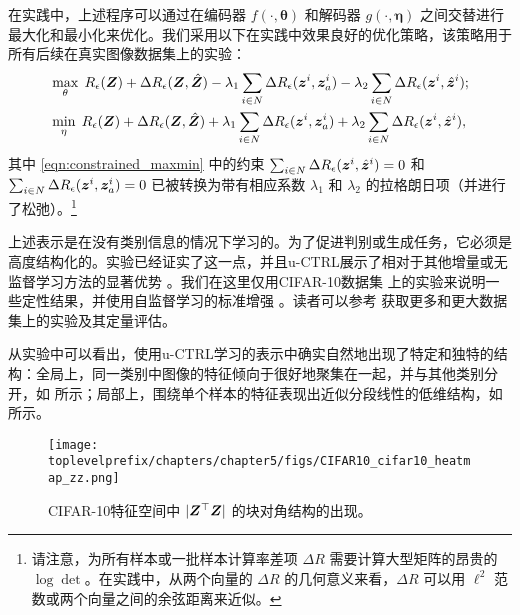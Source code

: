 \documentclass[../../book-main_zh.tex]{subfiles}
\begin{document}
在实践中，上述程序可以通过在编码器 $f(\cdot,\bm \theta)$ 和解码器 $g(\cdot,\bm \eta)$ 之间交替进行最大化和最小化来优化。我们采用以下在实践中效果良好的优化策略，该策略用于所有后续在真实图像数据集上的实验：
\vspace{-1mm}
\begin{align}
  &  \max_{\theta}\; R_\epsilon(\bm{Z}) + \Delta{R_\epsilon(\bm{Z}, \hat{\bm{Z}})-\lambda_{1}\sum_{i\in N} \Delta R_\epsilon(\bm{z}^i, \bm{z}_{a}^i)} -\lambda_{2}\sum_{i\in N} \Delta R_\epsilon(\bm{z}^i, \hat{\bm{z}}^i) \label{eqn:constrained_max}; \\
   & \min_{\eta}\; R_\epsilon(\bm{Z}) + \Delta{R_\epsilon(\bm{Z}, \hat{\bm{Z}})+\lambda_{1}\sum_{i\in N} \Delta R_\epsilon(\bm{z}^i, \bm{z}_{a}^i)+ \lambda_{2}\sum_{i\in N} \Delta R_\epsilon(\bm{z}^i, \hat{\bm{z}}^i)} \label{eqn:constrained_min}, 
\end{align}
其中 \eqref{eqn:constrained_maxmin} 中的约束 $\sum_{i\in N} \Delta R_\epsilon(\bm{z}^i, \hat{\bm{z}}^i) = 0$ 和 $\sum_{i\in N} \Delta R_\epsilon(\bm{z}^i, \bm{z}_{a}^i) = 0$ 已被转换为带有相应系数 $\lambda_{1}$ 和 $\lambda_{2}$ 的拉格朗日项（并进行了松弛）。\footnote{请注意，为所有样本或一批样本计算率差项 $\Delta R$ 需要计算大型矩阵的昂贵的 $\log\det$。在实践中，从两个向量的 $\Delta R$ 的几何意义来看，$\Delta R$ 可以用 $\ell^2$ 范数或两个向量之间的余弦距离来近似。}

上述表示是在没有类别信息的情况下学习的。为了促进判别或生成任务，它必须是高度结构化的。实验已经证实了这一点，并且u-CTRL展示了相对于其他增量或无监督学习方法的显著优势 \cite{pmlr-v234-tong24a}。我们在这里仅用CIFAR-10数据集 \cite{krizhevsky2014cifar} 上的实验来说明一些定性结果，并使用自监督学习的标准增强 \cite{chen2020simple}。读者可以参考 \cite{pmlr-v234-tong24a} 获取更多和更大数据集上的实验及其定量评估。

从实验中可以看出，使用u-CTRL学习的表示中确实自然地出现了特定和独特的结构：全局上，同一类别中图像的特征倾向于很好地聚集在一起，并与其他类别分开，如  所示；局部上，围绕单个样本的特征表现出近似分段线性的低维结构，如  所示。

\begin{figure}[t]
     \footnotesize
     \centering
    \texttt{[image: \\toplevelprefix/chapters/chapter5/figs/CIFAR10\_cifar10\_heatmap\_zz.png]}
    \caption{\small CIFAR-10特征空间中 $|\bm{Z}^\top \bm{Z}|$ 的块对角结构的出现。}
    \label{fig:heatmap_z}
\end{figure}
\end{document}
